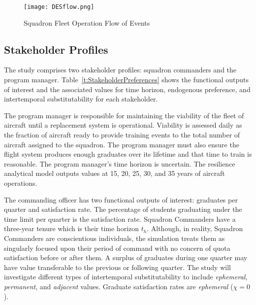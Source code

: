 \documentclass[preprint,12pt]{elsarticle}
\begin{document}




\begin{figure}[h]
  \centering\texttt{[image: DESflow.png]}
  \caption{Squadron Fleet Operation Flow of Events}
  \label{f:DESflow}
\end{figure}



\subsection{Stakeholder Profiles}

The study comprises two stakeholder profiles: squadron
commanders and the program manager. Table~\ref{t:StakeholderPreferences}
shows the functional outputs of interest and the associated values for
time horizon, endogenous preference, and intertemporal
substitutability for each stakeholder.

The program manager is responsible for maintaining the
viability of the fleet of aircraft until a replacement system is
operational. Viability is assessed daily as the fraction of 
aircraft ready to provide training events to the total number of aircraft
assigned to the squadron. The program manager must also ensure the flight system
produces enough graduates over its lifetime and that time to train is
reasonable. The program manager's time horizon is uncertain. The
resilience analytical model outputs values at 15, 20, 25, 30, and 35
years of aircraft operations.  

The commanding officer has two functional outputs of interest:
graduates per quarter and satisfaction rate. The
percentage of students graduating under the time limit per quarter is
the satisfaction rate. Squadron Commanders have a three-year
tenure which is their time horizon $t_h$. Although, in reality,
Squadron Commanders are conscientious 
individuals, the simulation treats them as singularly focused upon
their period of command with no concern of quota satisfaction before
or after them. A surplus of graduates during one quarter may have value
transferable to the previous or following quarter. The study will
investigate different types of intertemporal substitutability to include
\emph{ephemeral}, \emph{permanent}, and \emph{adjacent}
values. Graduate satisfaction rates are \emph{ephemeral} ($\chi = 0$).
\end{document}
